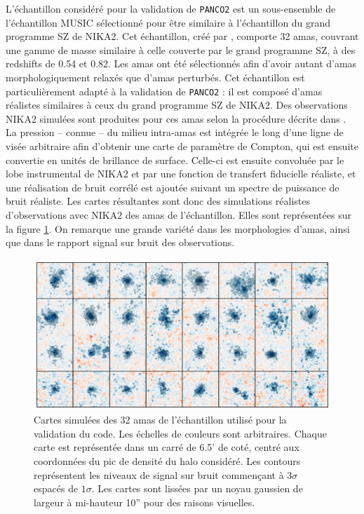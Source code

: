 L'échantillon considéré pour la validation de \texttt{PANCO2} est un sous-ensemble de l'échantillon MUSIC sélectionné pour être similaire à l'échantillon du grand programme SZ de NIKA2.
Cet échantillon, créé par , comporte 32 amas, couvrant une gamme de masse similaire à celle couverte par le grand programme SZ, à des redshifts de 0.54 et 0.82.
Les amas ont été sélectionnés afin d'avoir autant d'amas morphologiquement relaxés que d'amas perturbés.
Cet échantillon est particulièrement adapté à la validation de \texttt{PANCO2} : il est composé d'amas réalistes similaires à ceux du grand programme SZ de NIKA2.
Des observations NIKA2 simulées sont produites pour ces amas selon la procédure décrite dans \cite{ruppin_impact_2019}.
La pression -- connue -- du milieu intra-amas est intégrée le long d'une ligne de visée arbitraire afin d'obtenir une carte de paramètre de Compton, qui est ensuite convertie en unités de brillance de surface.
Celle-ci est ensuite convoluée par le lobe instrumental de NIKA2 et par une fonction de transfert fiducielle réaliste, et une réalisation de bruit corrélé est ajoutée suivant un spectre de puissance de bruit réaliste.
Les cartes résultantes sont donc des simulations réalistes d'observations avec NIKA2 des amas de l'échantillon.
Elles sont représentées sur la figure \ref{fig:panco:all_maps_music}.
On remarque une grande variété dans les morphologies d'amas, ainsi que dans le rapport signal sur bruit des observations.

\begin{figure}[t]
    \centering
    \includegraphics[width=\linewidth]{Figures/Chap_panco/all_maps_music.pdf}
    \caption{Cartes simulées des 32 amas de l'échantillon utilisé pour la validation du code.
        Les échelles de couleurs sont arbitraires.
        Chaque carte est représentée dans un carré de 6.5' de coté, centré aux coordonnées du pic de densité du halo considéré.
        Les contours représentent les niveaux de signal sur bruit commençant à $3\sigma$ espacés de $1\sigma$.
        Les cartes sont lissées par un noyau gaussien de largeur à mi-hauteur 10''  pour des raisons visuelles.
    }
    \label{fig:panco:all_maps_music}
\end{figure}

